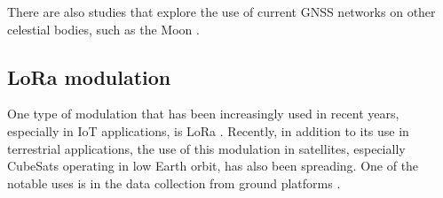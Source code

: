 There are also studies that explore the use of current GNSS networks on other celestial bodies, such as the Moon \cite{capuano2015} \cite{delepaut2020}.

\subsection{LoRa modulation}




One type of modulation that has been increasingly used in recent years, especially in IoT applications, is LoRa \cite{lora}. Recently, in addition to its use in terrestrial applications, the use of this modulation in satellites, especially CubeSats operating in low Earth orbit, has also been spreading. One of the notable uses is in the data collection from ground platforms \cite{anantachaisilp2020}.

